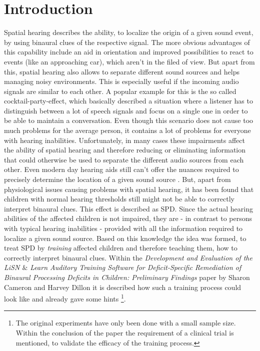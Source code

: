 \documentclass[a4paper,11pt]{article}%
\renewcommand{\\}{\vspace*{0.5\baselineskip} \newline}
\begin{document}
\section{Introduction}
\label{sec:introduction}
Spatial hearing describes the ability, to localize the origin of a given sound event, by using binaural clues of the respective signal. The more obvious advantages of this capability include an aid in orientation and improved possibilities to react to events (like an approaching car), which aren't in the filed of view.
\newline
\newline
But apart from this, spatial hearing also allows to separate different sound sources and helps managing noisy environments. This is especially useful if the incoming audio signals are similar to each other. A popular example for this is the so called \dq cocktail-party-effect\dq{}, which basically described a situation where a listener has to distinguish between a lot of speech signals and focus on a single one in order to be able to maintain a conversation.
\newline
\newline
Even though this scenario does not cause too much problems for the average person, it contains a lot of problems for everyone with hearing inabilities. Unfortunately, in many cases these impairments affect the ability of spatial hearing and therefore reducing or eliminating information that could otherwise be used to separate the different audio sources from each other. Even modern day hearing aids still can't offer the nuances required to precisely determine the location of a given sound source \cite{HA-SRT}.
\newline
\newline
But, apart from physiological issues causing problems with spatial hearing, it has been found that children with normal hearing thresholds still might not be able to correctly interpret binaural clues. This effect is described as \ac{SPD}. Since the actual hearing abilities of the affected children is not impaired, they are - in contrast to persons with typical hearing inabilities - provided with all the information required to localize a given sound source. Based on this knowledge the idea was formed, to treat \ac{SPD} by \textit{training} affected children and therefore teaching them, how to correctly interpret binaural clues.
\newline
\newline
Within the \textit{Development and Evaluation of the \ac{LiSN} $\&$ Learn Auditory Training Software for Deficit-Specific Remediation of Binaural Processing Deficits in Children: Preliminary Findings} \cite{LISN-A} paper by Sharon Cameron and Harvey Dillon it is described how such a training process could look like and already gave some hints \footnote{The original experiments have only been done with a small sample size. Within the conclusion of the paper the requirement of a clinical trial is mentioned, to validate the efficacy of the training process.}.
\end{document}
